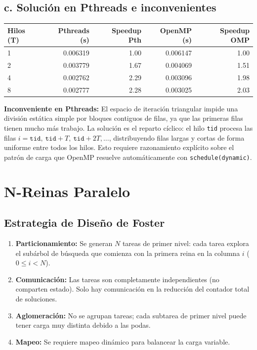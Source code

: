 \documentclass[11pt,a4paper]{article}
\begin{document}
\subsection*{c. Solución en Pthreads e inconvenientes}

\begin{center}
\begin{tabular}{|l|r|r|r|r|}
\hline
\textbf{Hilos (T)} & \textbf{Pthreads (s)} & \textbf{Speedup Pth} & \textbf{OpenMP (s)} & \textbf{Speedup OMP} \\
\hline
1 & 0.006319 & 1.00 & 0.006147 & 1.00 \\
2 & 0.003779 & 1.67 & 0.004069 & 1.51 \\
4 & 0.002762 & 2.29 & 0.003096 & 1.98 \\
8 & 0.002777 & 2.28 & 0.003025 & 2.03 \\
\hline
\end{tabular}
\end{center}

\textbf{Inconveniente en Pthreads:} El espacio de iteración triangular impide una división estática simple por bloques contiguos de filas, ya que las primeras filas tienen mucho más trabajo. La solución es el reparto cíclico: el hilo \texttt{tid} procesa las filas $i = \texttt{tid},\ \texttt{tid}+T,\ \texttt{tid}+2T,\ldots$, distribuyendo filas largas y cortas de forma uniforme entre todos los hilos. Esto requiere razonamiento explícito sobre el patrón de carga que OpenMP resuelve automáticamente con \texttt{schedule(dynamic)}.

\section{N-Reinas Paralelo}

\subsection*{Estrategia de Diseño de Foster}
\begin{enumerate}
    \item \textbf{Particionamiento:} Se generan $N$ tareas de primer nivel: cada tarea explora el subárbol de búsqueda que comienza con la primera reina en la columna $i$ ($0 \le i < N$).
    \item \textbf{Comunicación:} Las tareas son completamente independientes (no comparten estado). Solo hay comunicación en la reducción del contador total de soluciones.
    \item \textbf{Aglomeración:} No se agrupan tareas; cada subtarea de primer nivel puede tener carga muy distinta debido a las podas.
    \item \textbf{Mapeo:} Se requiere mapeo dinámico para balancear la carga variable.
\end{enumerate}
\end{document}
